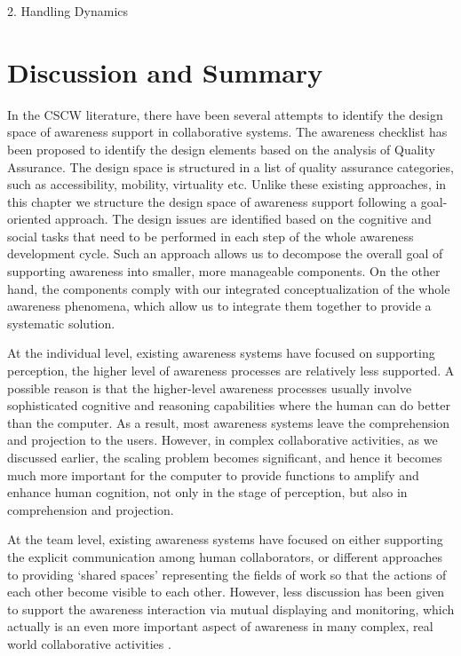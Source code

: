 2. Handling Dynamics



\section{Discussion and Summary} %
\label{sec:discussion_and_summary}
In the CSCW literature, there have been several attempts to identify the design space of awareness support in collaborative systems. The awareness checklist \cite{antunes2010a} has been proposed to identify the design elements based on the analysis of Quality Assurance. The design space is structured in a list of quality assurance categories, such as accessibility, mobility, virtuality etc. Unlike these existing approaches, in this chapter we structure the design space of awareness support following a goal-oriented approach. The design issues are identified based on the cognitive and social tasks that need to be performed in each step of the whole awareness development cycle. Such an approach allows us to decompose the overall goal of supporting awareness into smaller, more manageable components. On the other hand, the components comply with our integrated conceptualization of the whole awareness phenomena, which allow us to integrate them together to provide a systematic solution.

At the individual level, existing awareness systems have focused on supporting perception, the higher level of awareness processes are relatively less supported. A possible reason is that the higher-level awareness processes usually involve sophisticated cognitive and reasoning capabilities where the human can do better than the computer. As a result, most awareness systems leave the comprehension and projection to the users. However, in complex collaborative activities, as we discussed earlier, the scaling problem becomes significant, and hence it becomes much more important for the computer to provide functions to amplify and enhance human cognition, not only in the stage of perception, but also in comprehension and projection. 

At the team level, existing awareness systems have focused on either supporting the explicit communication among human collaborators, or different approaches to providing `shared spaces' representing the fields of work so that the actions of each other become visible to each other. However, less discussion has been given to support the awareness interaction via mutual displaying and monitoring, which actually is an even more important aspect of awareness in many complex, real world collaborative activities \cite{heath2002a}.






 


